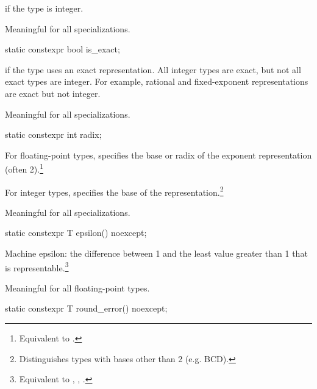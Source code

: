 \begin{itemdescr}
\pnum
{} if the type is integer.

\pnum
Meaningful for all specializations.
\end{itemdescr}

%
\begin{itemdecl}
static constexpr bool is_exact;
\end{itemdecl}

\begin{itemdescr}
\pnum
{} if the type uses an exact representation.
All integer types are exact, but not all exact types are integer.
For example, rational and fixed-exponent representations are exact but not integer.

\pnum
Meaningful for all specializations.
\end{itemdescr}

%
\begin{itemdecl}
static constexpr int radix;
\end{itemdecl}

\begin{itemdescr}
\pnum
For floating-point types, specifies the base or radix of the exponent representation
(often 2).\footnote{Equivalent to .}

\pnum
For integer types, specifies the base of the
representation.\footnote{Distinguishes types with bases other than 2 (e.g.
BCD).}

\pnum
Meaningful for all specializations.
\end{itemdescr}

%
\begin{itemdecl}
static constexpr T epsilon() noexcept;
\end{itemdecl}

\begin{itemdescr}
\pnum
Machine epsilon:  the difference between 1 and the least value greater than 1
that is representable.\footnote{Equivalent to , , .}

\pnum
Meaningful for all floating-point types.
\end{itemdescr}

%
\begin{itemdecl}
static constexpr T round_error() noexcept;
\end{itemdecl}

